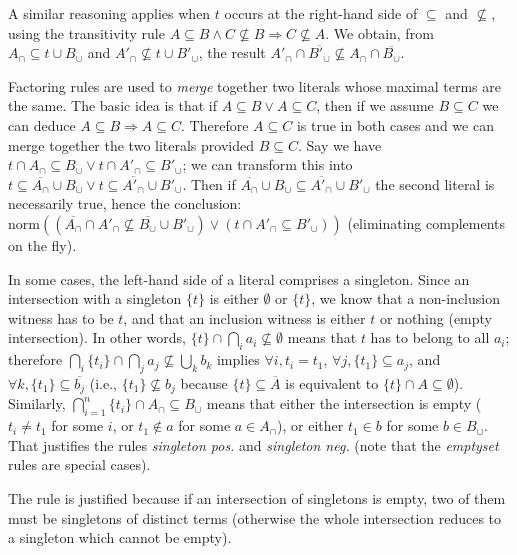 \documentclass{article}
\newcommand{\compl}[1]{\ensuremath{\overline{#1}}}
\newcommand{\normalize}[1]{\ensuremath{\text{norm}(#1)}}
\begin{document}
A similar reasoning applies when $t$ occurs at the right-hand side of
$\subseteq$ and $\not\subseteq$, using the transitivity rule
$A \subseteq B \land C \not\subseteq B \Rightarrow C \not\subseteq A$. We
obtain, from $A_\cap \subseteq t\cup B_\cup$ and
$A'_\cap \not\subseteq t\cup B'_\cup$, the result
$A'_\cap \cap \compl{B'_\cup} \not\subseteq A_\cap \cap \compl{B_\cup}$.

Factoring rules are used to \emph{merge} together two literals whose maximal
terms are the same. The basic idea is that if $A \subseteq B
\lor A \subseteq C$, then if we assume $B\subseteq C$ we can deduce
$A \subseteq B \Rightarrow A \subseteq C$. Therefore $A\subseteq C$ is true
in both cases and we can merge together the two literals provided $B\subseteq C$.
Say we have
$t \cap A_\cap \subseteq B_\cup \lor t \cap A'_\cap \subseteq B'_\cup$; we
can transform this into
$t \subseteq \compl{A_\cap} \cup B_\cup \lor t \subseteq \compl{A'_\cap} \cup B'_\cup$.
Then if $\compl{A_\cap} \cup B_\cup \subseteq \compl{A'_\cap} \cup B'_\cup$
the second literal is necessarily true, hence the conclusion:
$\normalize{(\compl{A_\cap} \cap A'_\cap \not\subseteq \compl{B_\cup} \cup B'_\cup) 
    \lor (t \cap A'_\cap \subseteq B'_\cup)}$ (eliminating complements
on the fly).

In some cases, the left-hand side of a literal comprises
a singleton. Since an intersection with a singleton $\{ t \}$ is either
$\emptyset$ or $\{ t\}$, we know that a non-inclusion witness has to be $t$,
and that an inclusion witness is either $t$ or nothing (empty intersection).
In other words, $\{ t \} \cap \bigcap_i a_i \not\subseteq \emptyset$
means that $t$ has to belong to all $a_i$; therefore
$\bigcap_i \{ t_i \} \cap \bigcap_j a_j \not\subseteq \bigcup_k b_k$
implies $\forall i, t_i = t_1$,
$\forall j, \{ t_1 \} \subseteq a_j$, and
$\forall k, \{ t_1 \} \subseteq \compl{b_j}$ (i.e.,
$\{ t_1 \} \not\subseteq b_j$ because $\{ t\} \subseteq \compl{A}$
is equivalent to $\{t \} \cap A \subseteq \emptyset$). Similarly,
$\bigcap_{i=1}^n \{ t_i \} \cap A_\cap \subseteq B_\cup$ means that
either the intersection is empty ($t_i \not= t_1$ for some $i$,
or $t_1 \not\in a$ for some $a \in A_\cap$), or either
$t_1 \in b$ for some $b \in B_\cup$.
That justifies the rules \emph{singleton pos.} and \emph{singleton neg.}
(note that the \emph{emptyset} rules are special cases).

The rule  is justified because if
an intersection of singletons is empty, two of them must be singletons
of distinct terms (otherwise the whole intersection reduces to a singleton
which cannot be empty).
\end{document}

